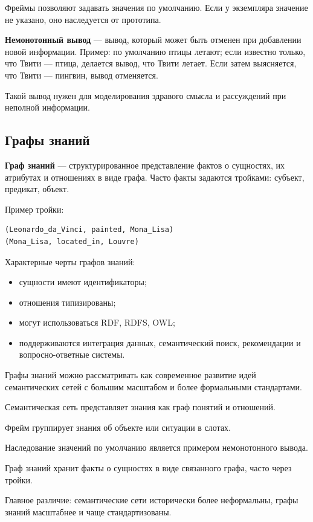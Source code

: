 Фреймы позволяют задавать значения по умолчанию. Если у экземпляра значение не указано, оно наследуется от прототипа.

\textbf{Немонотонный вывод} --- вывод, который может быть отменен при добавлении новой информации. Пример: по умолчанию птицы летают; если известно только, что Твити --- птица, делается вывод, что Твити летает. Если затем выясняется, что Твити --- пингвин, вывод отменяется.

Такой вывод нужен для моделирования здравого смысла и рассуждений при неполной информации.

\subsection*{Графы знаний}

\textbf{Граф знаний} --- структурированное представление фактов о сущностях, их атрибутах и отношениях в виде графа. Часто факты задаются тройками: субъект, предикат, объект.

Пример тройки:
\begin{verbatim}
(Leonardo_da_Vinci, painted, Mona_Lisa)
(Mona_Lisa, located_in, Louvre)
\end{verbatim}

Характерные черты графов знаний:
\begin{itemize}
    \item сущности имеют идентификаторы;
    \item отношения типизированы;
    \item могут использоваться RDF, RDFS, OWL;
    \item поддерживаются интеграция данных, семантический поиск, рекомендации и вопросно-ответные системы.
\end{itemize}

Графы знаний можно рассматривать как современное развитие идей семантических сетей с большим масштабом и более формальными стандартами.

\begin{important}
    \item Семантическая сеть представляет знания как граф понятий и отношений.
    \item Фрейм группирует знания об объекте или ситуации в слотах.
    \item Наследование значений по умолчанию является примером немонотонного вывода.
    \item Граф знаний хранит факты о сущностях в виде связанного графа, часто через тройки.
    \item Главное различие: семантические сети исторически более неформальны, графы знаний масштабнее и чаще стандартизованы.
\end{important}
